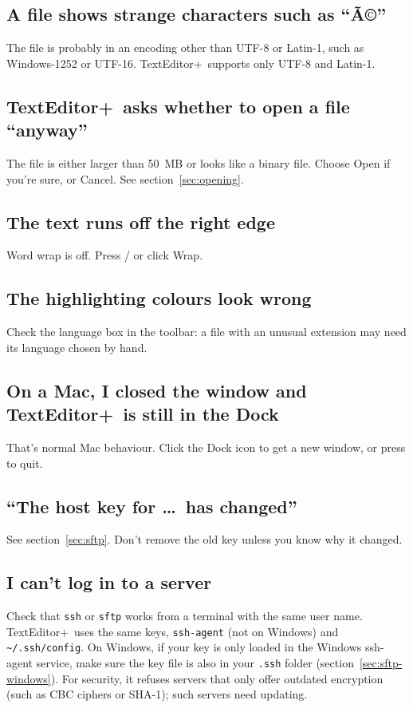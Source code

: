 \documentclass[11pt,a4paper]{article}
\newcommand{\appname}{TextEditor+}
\newcommand{\ui}[1]{\textsf{#1}}
\begin{document}
\subsection*{A file shows strange characters such as ``Ã©''}
The file is probably in an encoding other than UTF-8 or Latin-1, such as
Windows-1252 or UTF-16. \appname\ supports only UTF-8 and Latin-1.

\subsection*{\appname\ asks whether to open a file ``anyway''}
The file is either larger than 50~MB or looks like a binary file. Choose
\ui{Open} if you're sure, or \ui{Cancel}. See section~\ref{sec:opening}.

\subsection*{The text runs off the right edge}
Word wrap is off. Press  /  or click \ui{Wrap}.

\subsection*{The highlighting colours look wrong}
Check the language box in the toolbar: a file with an unusual extension may need
its language chosen by hand.

\subsection*{On a Mac, I closed the window and \appname\ is still in the Dock}
That's normal Mac behaviour. Click the Dock icon to get a new window, or press
 to quit.

\subsection*{``The host key for \dots\ has changed''}
See section~\ref{sec:sftp}. Don't remove the old key unless you know why it
changed.

\subsection*{I can't log in to a server}
Check that \texttt{ssh} or \texttt{sftp} works from a terminal with the same
user name. \appname\ uses the same keys, \texttt{ssh-agent} (not on Windows)
and \texttt{\textasciitilde/.ssh/config}. On Windows, if your key is only loaded
in the Windows \ui{ssh-agent} service, make sure the key file is also in your
\texttt{.ssh} folder (section~\ref{sec:sftp-windows}). For security, it refuses servers that only
offer outdated encryption (such as CBC ciphers or SHA-1); such servers need
updating.
\end{document}
